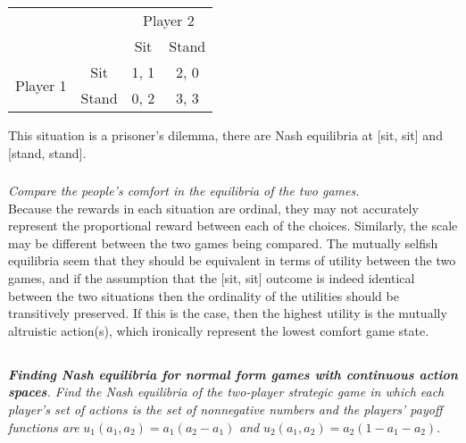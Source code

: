 \documentclass[12pt]{amsart}
\begin{document}
	\begin{center}
		\def\arraystretch{1.25}%
		\begin{tabular}{cccc}
			&                            & \multicolumn{2}{c}{Player 2}                           \\
			& \multicolumn{1}{c|}{}      & \multicolumn{1}{c|}{Sit}  & \multicolumn{1}{c|}{Stand} \\ \cline{2-4} 
			\multirow{2}{*}{Player 1} & \multicolumn{1}{c|}{Sit}   & \multicolumn{1}{c|}{1, 1} & \multicolumn{1}{c|}{2, 0}  \\ \cline{2-4} 
			& \multicolumn{1}{c|}{Stand} & \multicolumn{1}{c|}{0, 2} & \multicolumn{1}{c|}{3, 3}  \\ \cline{2-4} 
		\end{tabular}
	\end{center}
	
	This situation is a prisoner's dilemma, there are Nash equilibria at [sit, sit] and [stand, stand].
	
	\subsubsection{}
	\textit{Compare the people’s comfort in the equilibria of the two games.} \\

	Because the rewards in each situation are ordinal, they may not accurately represent the proportional
	reward between each of the choices. Similarly, the scale may be different between the two games being compared.
	The mutually selfish equilibria seem that they should be equivalent in terms of utility between the two games, 
	and if the assumption that the [sit, sit] outcome is indeed identical between the two situations
	then the ordinality of the utilities should be transitively preserved.
	If this is the case, then the highest utility is the mutually altruistic action(s), which ironically
	represent the lowest comfort game state. \\


\clearpage


\subsection{}
\textit{\textbf{Finding Nash equilibria for normal form games with continuous action spaces}. 
	Find the Nash equilibria of the two-player strategic game in which each player’s set of actions is the
	set of nonnegative numbers and the players’ payoff functions are}
	$u_1(a_1,a_2) =a_1(a_2-a_1)$ \textit{and} $u_2(a_1,a_2) = a_2(1-a_1-a_2)$. \\
\end{document}
